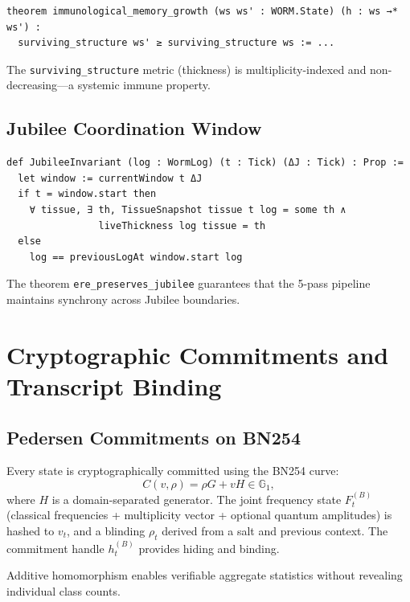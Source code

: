 \documentclass[11pt,a4paper]{article}
\theoremstyle{definition}
\theoremstyle{remark}
\begin{document}
\begin{lstlisting}[language=Lean, caption={Immunological memory growth (WORM.Immuno.lean)}]
theorem immunological_memory_growth (ws ws' : WORM.State) (h : ws →* ws') :
  surviving_structure ws' ≥ surviving_structure ws := ...
\end{lstlisting}

The \texttt{surviving\_structure} metric (thickness) is multiplicity-indexed and non-decreasing—a systemic immune property.

\subsection{Jubilee Coordination Window}
\label{subsec:lean_jubilee}

\begin{lstlisting}[language=Lean, caption={Jubilee invariant (WORM.Jubilee.lean)}]
def JubileeInvariant (log : WormLog) (t : Tick) (ΔJ : Tick) : Prop :=
  let window := currentWindow t ΔJ
  if t = window.start then
    ∀ tissue, ∃ th, TissueSnapshot tissue t log = some th ∧
                liveThickness log tissue = th
  else
    log == previousLogAt window.start log
\end{lstlisting}

The theorem \texttt{ere\_preserves\_jubilee} guarantees that the 5-pass pipeline maintains synchrony across Jubilee boundaries.

\section{Cryptographic Commitments and Transcript Binding}
\label{sec:crypto}

\subsection{Pedersen Commitments on BN254}
\label{subsec:pedersen}

Every state is cryptographically committed using the BN254 curve:
\[
C(v, \rho) = \rho G + v H \in \mathbb{G}_1,
\]
where $H$ is a domain-separated generator. The joint frequency state $F_t^{(B)}$ (classical frequencies + multiplicity vector + optional quantum amplitudes) is hashed to $v_t$, and a blinding $\rho_t$ derived from a salt and previous context. The commitment handle $h_t^{(B)}$ provides hiding and binding.

Additive homomorphism enables verifiable aggregate statistics without revealing individual class counts.
\end{document}
